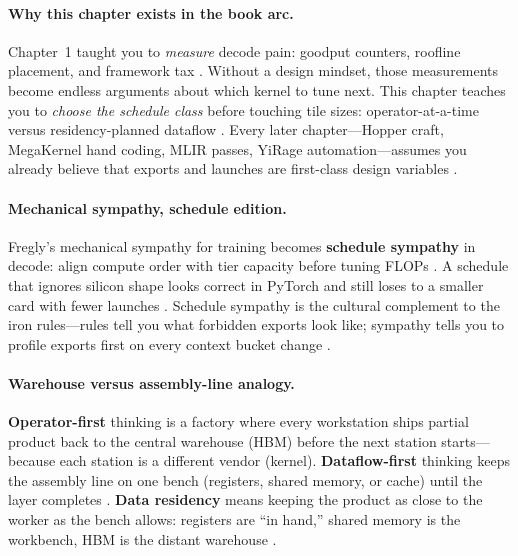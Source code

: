 \paragraph{Why this chapter exists in the book arc.}
Chapter~1 taught you to \emph{measure} decode pain: goodput counters, roofline placement, and framework tax \citep{taxbreak2026,memoryfloor2026}.
Without a design mindset, those measurements become endless arguments about which kernel to tune next.
This chapter teaches you to \emph{choose the schedule class} before touching tile sizes: operator-at-a-time versus residency-planned dataflow \citep{chen2020compilerbasedhardw,yirage2026}.
Every later chapter---Hopper craft, MegaKernel hand coding, MLIR passes, YiRage automation---assumes you already believe that exports and launches are first-class design variables \citep{patel2025llminference}.

\paragraph{Mechanical sympathy, schedule edition.}
Fregly's mechanical sympathy for training becomes \textbf{schedule sympathy} in decode: align compute order with tier capacity before tuning FLOPs \citep{dlbook,patel2025llminference}.
A schedule that ignores silicon shape looks correct in PyTorch and still loses to a smaller card with fewer launches \citep{memoryfloor2026}.
Schedule sympathy is the cultural complement to the iron rules---rules tell you what forbidden exports look like; sympathy tells you to profile exports first on every context bucket change \citep{taxbreak2026}.

\paragraph{Warehouse versus assembly-line analogy.}
\textbf{Operator-first} thinking is a factory where every workstation ships partial product back to the central warehouse (HBM) before the next station starts---because each station is a different vendor (kernel).
\textbf{Dataflow-first} thinking keeps the assembly line on one bench (registers, shared memory, or cache) until the layer completes \citep{dlbook}.
\textbf{Data residency} means keeping the product as close to the worker as the bench allows: registers are ``in hand,'' shared memory is the workbench, HBM is the distant warehouse \citep{memoryfloor2026}.

